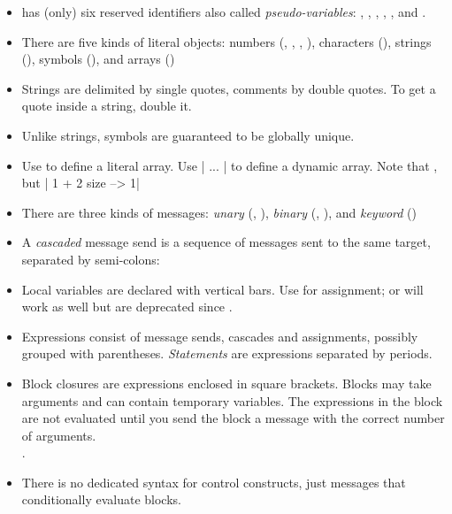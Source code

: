 \documentclass[a4paper,10pt,twoside]{book}
\begin{document}
\begin{itemize}

\item	\sq has (only) six reserved identifiers also called \textit{pseudo-variables}: , , , , ,  and  .

\item	There are five kinds of literal objects: numbers (, , , ), characters (), strings (), symbols (), and arrays ()

\item	Strings are delimited by single quotes, comments by double quotes.
		To get a quote inside a string, double it.

\item	Unlike strings, symbols are guaranteed to be globally unique.

\item	Use  to define a literal array.
		Use \ct|{ ... }| to define a dynamic array.
		Note that 
		, but 
		\ct|{ 1 + 2 } size --> 1|

\item	There are three kinds of messages:
		\emph{unary} (\eg {}, ),
		\emph{binary} (\eg {}, ), and
		\emph{keyword} (\eg {})

\item	A \emph{cascaded} message send is a sequence of messages sent to the same target, separated by semi-colons:

\item	Local variables are declared with vertical bars.
		Use \ct{:=} for assignment; \ct{_} or  will work as well but are deprecated since .

\item	Expressions consist of message sends, cascades and assignments, possibly grouped with parentheses.
		\emph{Statements} are expressions separated by periods.

\item	Block closures are expressions enclosed in square brackets.
		Blocks may take arguments and can contain temporary variables.
		The expressions in the block are not evaluated until you send the block a 
		 message with the correct number of arguments.\\
		.

\item	There is no dedicated syntax for control constructs, just messages that conditionally evaluate blocks.\\

\end{itemize}

\ifx\wholebook\relax\else
\end{document}
